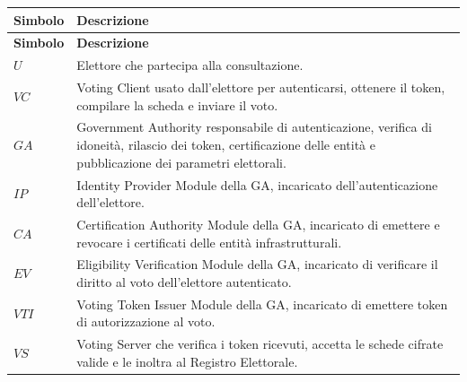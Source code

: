 \documentclass[a4paper,12pt]{article}
\begin{document}
\begin{longtable}{|>{\raggedright\arraybackslash}p{}|>{\raggedright\arraybackslash}p{}|}
	\hline
	\rowcolor{HeaderBlue}\textbf{Simbolo} & \textbf{Descrizione}                                                                                                                                                 \\
	\hline
	\endfirsthead
	\hline
	\rowcolor{HeaderBlue}\textbf{Simbolo} & \textbf{Descrizione}                                                                                                                                                 \\
	\hline
	\endhead
	$U$                                   & Elettore che partecipa alla consultazione.                                                                                                                           \\
	\hline
	$VC$                                  & Voting Client usato dall'elettore per autenticarsi, ottenere il token, compilare la scheda e inviare il voto.                                                        \\
	\hline
	$GA$                                  & Government Authority responsabile di autenticazione, verifica di idoneità, rilascio dei token, certificazione delle entità e pubblicazione dei parametri elettorali. \\
	\hline
	$IP$                                  & Identity Provider Module della GA, incaricato dell'autenticazione dell'elettore.                                                                                     \\
	\hline
	$CA$                                  & Certification Authority Module della GA, incaricato di emettere e revocare i certificati delle entità infrastrutturali.                                              \\
	\hline
	$EV$                                  & Eligibility Verification Module della GA, incaricato di verificare il diritto al voto dell'elettore autenticato.                                                     \\
	\hline
	$VTI$                                 & Voting Token Issuer Module della GA, incaricato di emettere token di autorizzazione al voto.                                                                         \\
	\hline
	$VS$                                  & Voting Server che verifica i token ricevuti, accetta le schede cifrate valide e le inoltra al Registro Elettorale.                                                   \\

\end{longtable}
\end{document}
